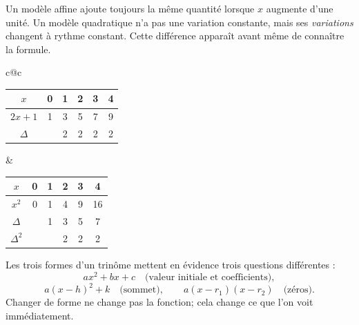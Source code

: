 \documentclass[12pt,a4paper,openany]{book}
\begin{document}
\begin{visualbox}
Un modèle affine ajoute toujours la même quantité lorsque $x$ augmente d'une unité. Un modèle quadratique n'a pas une variation constante, mais ses \emph{variations} changent à rythme constant. Cette différence apparaît avant même de connaître la formule.
\end{visualbox}

\begin{center}
\begin{tabular}{c@{\hspace{1.4cm}}c}
\begin{tabular}{c|ccccc}
$x$&0&1&2&3&4\\\hline
$2x+1$&1&3&5&7&9\\
$\Delta$&&2&2&2&2
\end{tabular}
&
\begin{tabular}{c|ccccc}
$x$&0&1&2&3&4\\\hline
$x^2$&0&1&4&9&16\\
$\Delta$&&1&3&5&7\\
$\Delta^2$&&&2&2&2
\end{tabular}
\end{tabular}
\end{center}

\begin{center}
\qquad
{}
\end{center}

\begin{connectionbox}
Les trois formes d'un trinôme mettent en évidence trois questions différentes :
\[
ax^2+bx+c \quad\text{(valeur initiale et coefficients)},
\]
\[
a(x-h)^2+k \quad\text{(sommet)},
\qquad
 a(x-r_1)(x-r_2) \quad\text{(zéros)}.
\]
Changer de forme ne change pas la fonction; cela change ce que l'on voit immédiatement.
\end{connectionbox}
\end{document}
